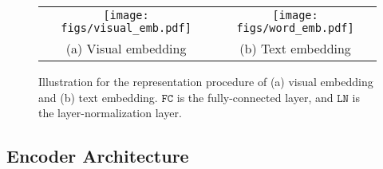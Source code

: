 \documentclass[10pt,twocolumn,letterpaper]{article}
\begin{document}
\begin{figure}[t!]\vspace{-0mm}\centering
	\begin{tabular}{cc}
	    \hspace{-3mm}		
		\texttt{[image: figs/visual\_emb.pdf]} &
		 \hspace{3mm}		
		\texttt{[image: figs/word\_emb.pdf]}\\
		(a) Visual embedding &
		\hspace{3mm}		
		(b) Text embedding 
	\end{tabular}
	\vspace{-0mm}
	\caption{Illustration for the representation procedure of (a) visual embedding and (b) text embedding. $\mathtt{FC}$ is the fully-connected layer, and $\mathtt{LN}$ is the layer-normalization layer.}
	\vspace{-0mm}
	\label{fig:vision_lang_emb}
\end{figure}


\subsection{Encoder Architecture}
\end{document}
